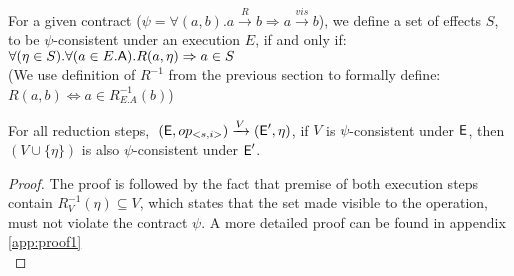 %
%
\begin{definition}
For a given contract ($\psi=\forall(a,b). a
\xrightarrow{R} b \Rightarrow a \xrightarrow{vis} b $), we define a set
of effects $S$, to be  $\psi$-consistent under an execution $E$, if and
only if: 
$\forall (\eta \in S). \forall(a\in E.{\normalfont \textsf{A}}). R(a,\eta)
\Rightarrow a \in S$ 
\\(We use definition of $R^{-1}$ from the previous section to formally
define: $R(a,b) \iff a \in R_{E.A}^{-1}(b)  $)
\end{definition}

\begin{theorem}
\label{theorem:one}
For all reduction steps, 
$
\; ({\normalfont \textsf{E}},op_{<s,i>}) 
    \xrightarrow{V}
  ({\normalfont \textsf{E}}',\eta)  
$,
if $V$ is $\psi$-consistent under ${\normalfont \textsf{E}}$, then $(V\cup\{\eta\})$ is also
$\psi$-consistent under ${\normalfont \textsf{E}}'$.
\end{theorem}
\begin{proof}
The proof is followed by the fact that premise of both execution steps contain 
$R_V^{-1}(\eta)\subseteq V$, which states that the set made visible to
the operation, must not violate the contract $\psi$. A more detailed proof can
be found in appendix \ref{app:proof1}
\\
\end{proof}





